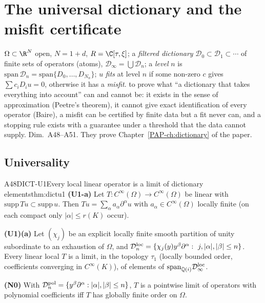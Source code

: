 \chapter[Dictionary and misfit]{The universal dictionary and the misfit certificate}\label{ch:cIII5}
\chapterbrief
{$\Omega\subset\R^N$ open, $N=1+d$, $R=\C[\tau,\xi]$; a \emph{filtered dictionary} $\mathcal D_0\subset\mathcal D_1\subset\cdots$ of finite sets of operators (atoms), $\mathcal D_\infty=\bigcup\mathcal D_n$; a \emph{level} $n$ is $\mathrm{span}\,\mathcal D_n=\mathrm{span}\{D_0,\dots,D_{N_n}\}$; $u$ \emph{fits} at level $n$ if some non-zero $c$ gives $\sum c_iD_iu=0$, otherwise it has a \emph{misfit}.}
{to prove what ``a dictionary that takes everything into account'' can and cannot be: it exists in the sense of approximation (Peetre's theorem), it cannot give exact identification of every operator (Baire), a misfit can be certified by finite data but a fit never can, and a stopping rule exists with a guarantee under a threshold that the data cannot supply.}
{Dim.~A48--A51. They prove Chapter~\ref{PAP-ch:dictionary} of the paper.}

\section{Universality}

\begin{dimcard}{A48}{DICT-U1}{Every local linear operator is a limit of dictionary elements}{\proved}{thm:dictu1}
\textbf{(U1-a)} Let $T:C^\infty(\Omega)\to C^\infty(\Omega)$ be linear with $\mathrm{supp}\,Tu\subset\mathrm{supp}\,u$. Then $Tu=\sum_\alpha a_\alpha\partial^\alpha u$ with $a_\alpha\in C^\infty(\Omega)$ locally finite (on each compact only $|\alpha|\le r(K)$ occur).

\textbf{(U1)(a)} Let $(\chi_j)$ be an explicit locally finite smooth partition of unity subordinate to an exhaustion of $\Omega$, and $\mathcal D^{\rm loc}_n=\{\chi_j(y)y^\beta\partial^\alpha:\ j,|\alpha|,|\beta|\le n\}$. Every linear local $T$ is a limit, in the topology $\tau_1$ (locally bounded order, coefficients converging in $C^\infty(K)$), of elements of $\mathrm{span}_{\mathbb Q(i)}\mathcal D^{\rm loc}_\infty$.

\textbf{(N0)} With $\mathcal D^{\rm pol}_n=\{y^\beta\partial^\alpha:|\alpha|,|\beta|\le n\}$, $T$ is a pointwise limit of operators with polynomial coefficients iff $T$ has globally finite order on $\Omega$.
\end{dimcard}

